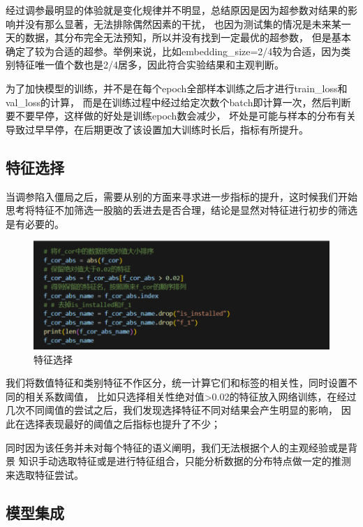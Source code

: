 \documentclass{article}
\begin{document}
经过调参最明显的体验就是变化规律并不明显，总结原因是因为超参数对结果的影响并没有那么显著，无法排除偶然因素的干扰，
也因为测试集的情况是未来某一天的数据，其分布完全无法预知，所以并没有找到一定最优的超参数，
但是基本确定了较为合适的超参。举例来说，比如embedding\_size=2/4较为合适，因为类别特征唯一值个数也是2/4居多，因此符合实验结果和主观判断。

为了加快模型的训练，并不是在每个epoch全部样本训练之后才进行train\_loss和val\_loss的计算，
而是在训练过程中经过给定次数个batch即计算一次，然后判断要不要早停，这样做的好处是训练epoch数会减少，
坏处是可能与样本的分布有关导致过早早停，在后期更改了该设置加大训练时长后，指标有所提升。

\subsection{特征选择}

当调参陷入僵局之后，需要从别的方面来寻求进一步指标的提升，这时候我们开始思考将特征不加筛选一股脑的丢进去是否合理，结论是显然对特征进行初步的筛选是有必要的。

\begin{figure}[htbp]
  \centering
  \includegraphics[scale=0.3]{feature.png}
  \caption{特征选择}
  \label{figure9}
\end{figure}

我们将数值特征和类别特征不作区分，统一计算它们和标签的相关性，同时设置不同的相关系数阈值，
比如只选择相关性绝对值>0.02的特征放入网络训练，在经过几次不同阈值的尝试之后，我们发现选择特征不同对结果会产生明显的影响，
因此在选择表现最好的阈值之后指标也提升了不少；

同时因为该任务并未对每个特征的语义阐明，我们无法根据个人的主观经验或是背景
知识手动选取特征或是进行特征组合，只能分析数据的分布特点做一定的推测来选取特征尝试。


\subsection{模型集成}
\end{document}
